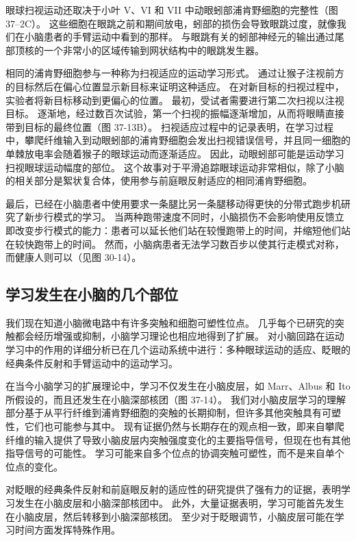 眼球扫视运动还取决于小叶 V、VI 和 VII 中动眼蚓部浦肯野细胞的完整性（图 37–2C）。 这些细胞在眼跳之前和期间放电，蚓部的损伤会导致眼跳过度，就像我们在小脑患者的手臂运动中看到的那样。 与眼跳有关的蚓部神经元的输出通过尾部顶核的一个非常小的区域传输到网状结构中的眼跳发生器。

相同的浦肯野细胞参与一种称为扫视适应的运动学习形式。 通过让猴子注视前方的目标然后在偏心位置显示新目标来证明这种适应。 在对新目标的扫视过程中，实验者将新目标移动到更偏心的位置。 最初，受试者需要进行第二次扫视以注视目标。 逐渐地，经过数百次试验，第一个扫视的振幅逐渐增加，从而将眼睛直接带到目标的最终位置（图 37-13B）。 扫视适应过程中的记录表明，在学习过程中，攀爬纤维输入到动眼蚓部的浦肯野细胞会发出扫视错误信号，并且同一细胞的单棘放电率会随着猴子的眼球运动而逐渐适应。 因此，动眼蚓部可能是运动学习扫视眼球运动幅度的部位。 这个故事对于平滑追踪眼球运动非常相似，除了小脑的相关部分是絮状复合体，使用参与前庭眼反射适应的相同浦肯野细胞。

最后，已经在小脑患者中使用要求一条腿比另一条腿移动得更快的分带式跑步机研究了新步行模式的学习。 当两种跑带速度不同时，小脑损伤不会影响使用反馈立即改变步行模式的能力：患者可以延长他们站在较慢跑带上的时间，并缩短他们站在较快跑带上的时间。 然而，小脑病患者无法学习数百步以使其行走模式对称，而健康人则可以（见图 30-14）。

\subsection{学习发生在小脑的几个部位}

我们现在知道小脑微电路中有许多突触和细胞可塑性位点。 几乎每个已研究的突触都会经历增强或抑制，小脑学习理论也相应地得到了扩展。 对小脑回路在运动学习中的作用的详细分析已在几个运动系统中进行：多种眼球运动的适应、眨眼的经典条件反射和手臂运动中的运动学习。

在当今小脑学习的扩展理论中，学习不仅发生在小脑皮层，如 Marr、Albus 和 Ito 所假设的，而且还发生在小脑深部核团（图 37-14）。 我们对小脑皮层学习的理解部分基于从平行纤维到浦肯野细胞的突触的长期抑制，但许多其他突触具有可塑性，它们也可能参与其中。 现有证据仍然与长期存在的观点相一致，即来自攀爬纤维的输入提供了导致小脑皮层内突触强度变化的主要指导信号，但现在也有其他指导信号的可能性。 学习可能来自多个位点的协调突触可塑性，而不是来自单个位点的变化。

对眨眼的经典条件反射和前庭眼反射的适应性的研究提供了强有力的证据，表明学习发生在小脑皮层和小脑深部核团中。 此外，大量证据表明，学习可能首先发生在小脑皮层，然后转移到小脑深部核团。 至少对于眨眼调节，小脑皮层可能在学习时间方面发挥特殊作用。

